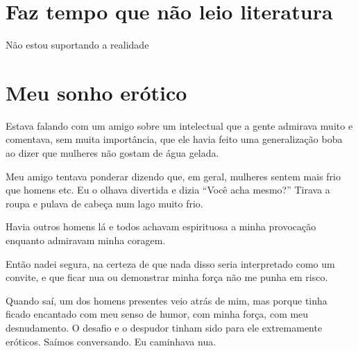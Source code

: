 \chapter{Faz tempo que não leio literatura}

Não estou suportando a realidade

\chapter{Meu sonho erótico}\label{meu-sonho-eruxf3tico}

Estava falando com um amigo sobre um intelectual que a gente admirava
muito e comentava, sem muita importância, que ele havia feito uma
generalização boba ao dizer que mulheres não gostam de água gelada.

Meu amigo tentava ponderar dizendo que, em geral, mulheres sentem mais
frio que homens etc. Eu o olhava divertida e dizia ``Você acha mesmo?''
Tirava a roupa e pulava de cabeça num lago muito frio.

Havia outros homens lá e todos achavam espirituosa a minha provocação
enquanto admiravam minha coragem.

Então nadei segura, na certeza de que nada disso seria interpretado como
um convite, e que ficar nua ou demonstrar minha força não me punha em
risco.

Quando saí, um dos homens presentes veio atrás de mim, mas porque tinha
ficado encantado com meu senso de humor, com minha força, com meu
desnudamento. O desafio e o despudor tinham sido para ele extremamente
eróticos. Saímos conversando. Eu caminhava nua.
